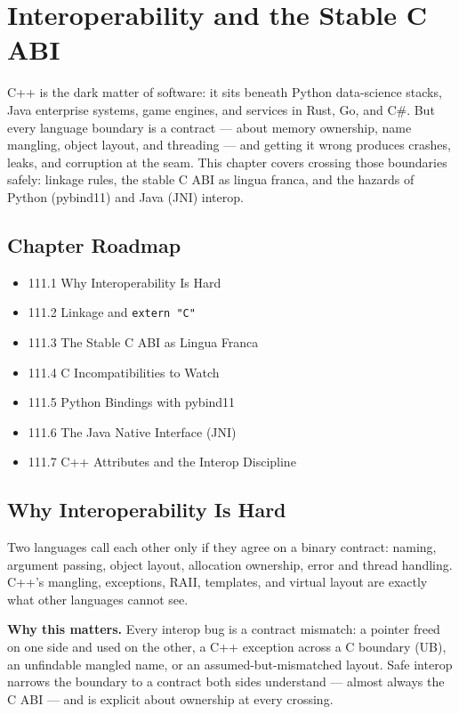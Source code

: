 \chapter{Interoperability and the Stable C ABI}

C++ is the dark matter of software: it sits beneath Python data-science stacks, Java enterprise systems, game engines, and services in Rust, Go, and C\#. But every language boundary is a contract --- about memory ownership, name mangling, object layout, and threading --- and getting it wrong produces crashes, leaks, and corruption at the seam. This chapter covers crossing those boundaries safely: linkage rules, the stable C ABI as lingua franca, and the hazards of Python (pybind11) and Java (JNI) interop.

\section*{Chapter Roadmap}
\begin{itemize}
\item 111.1 Why Interoperability Is Hard
\item 111.2 Linkage and \texttt{extern "C"}
\item 111.3 The Stable C ABI as Lingua Franca
\item 111.4 C Incompatibilities to Watch
\item 111.5 Python Bindings with pybind11
\item 111.6 The Java Native Interface (JNI)
\item 111.7 C++ Attributes and the Interop Discipline
\end{itemize}

\section{Why Interoperability Is Hard}
Two languages call each other only if they agree on a binary contract: naming, argument passing, object layout, allocation ownership, error and thread handling. C++'s mangling, exceptions, RAII, templates, and virtual layout are exactly what other languages cannot see.

\textbf{Why this matters.} Every interop bug is a contract mismatch: a pointer freed on one side and used on the other, a C++ exception across a C boundary (UB), an unfindable mangled name, or an assumed-but-mismatched layout. Safe interop narrows the boundary to a contract both sides understand --- almost always the C ABI --- and is explicit about ownership at every crossing.

